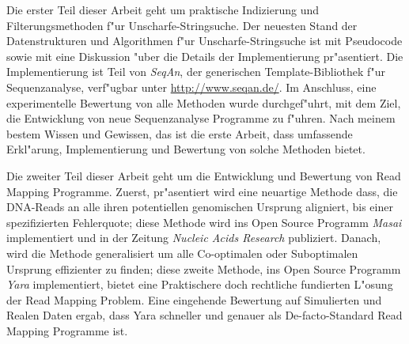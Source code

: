 Die erster Teil dieser Arbeit geht um praktische Indizierung und Filterungsmethoden f"ur Unscharfe-Stringsuche.
Der neuesten Stand der Datenstrukturen und Algorithmen f"ur Unscharfe-Stringsuche ist mit Pseudocode sowie mit eine Diskussion "uber die Details der Implementierung pr"asentiert.
Die Implementierung ist Teil von \emph{SeqAn}, der generischen \CC Template-Bibliothek f"ur Sequenzanalyse, verf"ugbar unter \url{http://www.seqan.de/}.
Im Anschluss, eine experimentelle Bewertung von alle Methoden wurde durchgef"uhrt, mit dem Ziel, die Entwicklung von neue Sequenzanalyse Programme zu f"uhren.
Nach meinem bestem Wissen und Gewissen, das ist die erste Arbeit, dass umfassende Erkl"arung, Implementierung und Bewertung von solche Methoden bietet.

Die zweiter Teil dieser Arbeit geht um die Entwicklung und Bewertung von Read Mapping Programme.
Zuerst, pr"asentiert wird eine neuartige Methode dass, die DNA-Reads an alle ihren potentiellen genomischen Ursprung aligniert, bis einer spezifizierten Fehlerquote;
diese Methode wird ins Open Source Programm \emph{Masai} implementiert und in der Zeitung \emph{Nucleic Acids Research} publiziert.
Danach, wird die Methode generalisiert um alle Co-optimalen oder Suboptimalen Ursprung effizienter zu finden;
diese zweite Methode, ins Open Source Programm \emph{Yara} implementiert, bietet eine Praktischere doch rechtliche fundierten L"osung der Read Mapping Problem.
Eine eingehende Bewertung auf Simulierten und Realen Daten ergab, dass Yara schneller und genauer als De-facto-Standard Read Mapping Programme ist.


\newpage
